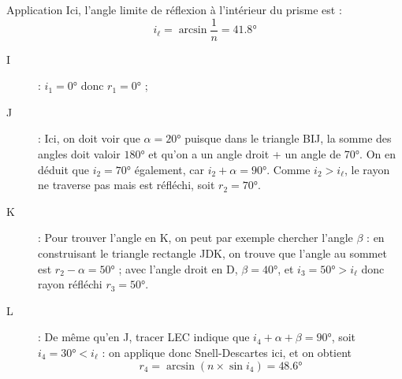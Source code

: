 \documentclass[../main/main.tex]{subfiles}
\begin{document}
\begin{NCexem}[sidebyside]{Application}
    Ici, l'angle limite de réflexion à l'intérieur du prisme est : \[i_\ell =
    \arcsin \frac{1}{n} = \boxed{ \ang{41.8;;}}\]
    \begin{description}
        \item[I] : $\boxed{i_1 = \ang{0;;}}$ donc
            $\boxed{r_1 = \ang{0;;}}$ ;
        \item[J] : Ici, on doit voir que $\alpha = \ang{20;;}$ puisque
            dans le triangle BIJ, la somme des angles doit valoir $\ang{180;;}$
            et qu'on a un angle droit + un angle de \ang{70;;}.
            On en déduit que $\boxed{i_2 = \ang{70;;}}$ également, car
            $i_2 + \alpha = \ang{90;;}$.\smallbreak
            Comme \underline{$i_2 > i_\ell$}, le rayon ne traverse pas mais est
            réfléchi, soit $\boxed{r_2 = \ang{70;;}}$.
    \end{description}
    \tcblower
    \begin{description}
        \item[K] : Pour trouver l'angle en K, on peut par exemple chercher
            l'angle $\beta$ : en construisant le triangle rectangle JDK, on
            trouve que l'angle au sommet est $r_2 - \alpha = \ang{50;;}$ ;
            avec l'angle droit en D, $\beta = \ang{40;;}$, et $\boxed{i_3
            = \ang{50;;} > i_\ell}$ donc rayon réfléchi $\boxed{r_3 =
        \ang{50;;}}$.
        \item[L] : De même qu'en J, tracer LEC indique que $i_4 + \alpha + \beta
            = \ang{90;;}$, soit $\boxed{i_4 = \ang{30;;} < i_\ell}$
            : on applique donc Snell-Descartes ici, et on obtient
            \[\boxed{r_4} = \arcsin (n\times \sin i_4) =
            \boxed{\ang{48.6;;}}\]
    \end{description}
\end{NCexem}
\end{document}
